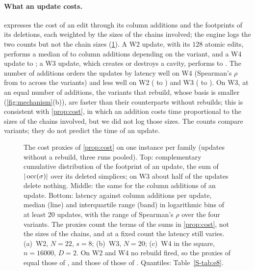 \paragraph{What an update costs.}
 expresses the cost of an edit through its column additions and
the footprints of its deletions, each weighted by the sizes of the chains
involved; the engine logs the two counts but not the chain sizes
(\cref{fig:proxies}). A W2 update, with its $128$ atomic edits, performs a
median of \NumEEightWTwoNTwentyTwoSEightDrbIdAddsMed{} to
\NumEEightWTwoNTwentyTwoSEightMmhmAddsMed{} column additions depending on the
variant, and a W4 update \NumEEightWFourPlaneNSixteenThousandDTwoMmhmAddsMed{} to
\NumEEightWFourPlaneNSixteenThousandDTwoDrbIdAddsMed; a W3 update, which creates
or destroys a cavity, performs \NumEEightWThreeNTwentyMmhmAddsMed{} to
\NumEEightWThreeNTwentyDrbIdAddsMed. The number of additions orders the updates
by latency well on W4 (Spearman's $\rho$ from \NumMainRhoAddsWFourMin{} to
\NumMainRhoAddsWFourMax{} across the variants) and less well on W2
(\NumMainRhoAddsWTwoMin{} to \NumMainRhoAddsWTwoMax) and W3
(\NumMainRhoAddsWThreeMin{} to \NumMainRhoAddsWThreeMax). On W3, at an equal
number of additions, the variants that rebuild, whose basis is smaller
(\cref{fig:mechanism}(b)), are faster than their counterparts without rebuilds;
this is consistent with \cref{prop:cost}, in which an addition costs time
proportional to the sizes of the chains involved, but we did not log those
sizes. The counts compare variants; they do not predict the time of an update.

\begin{figure}[t]
  \centering
  \caption{The cost proxies of \cref{prop:cost} on one instance per family
    (updates without a rebuild, three runs pooled). Top: complementary
    cumulative distribution of the footprint of an update, the sum of
    $|\operatorname{occ}(\sigma)|$ over its deleted simplices; on W3 about half of the
    updates delete nothing. Middle: the same for the column additions of an
    update. Bottom: latency against column additions per update, median (line)
    and interquartile range (band) in logarithmic bins of at least 20 updates,
    with the range of Spearman's $\rho$ over the four variants. The proxies
    count the terms of the sums in \cref{prop:cost}, not the sizes of the
    chains, and at a fixed count the latency still varies. (a)~W2, $N=22$,
    $s=8$; (b)~W3, $N=20$; (c)~W4 in the square, $n=16000$, $D=2$. On W2 and W4
    no rebuild fired, so the proxies of  equal those of
    , and those of  those of
    . Quantiles: Table~\ref{S-tab:e8}.}
  \label{fig:proxies}
\end{figure}

